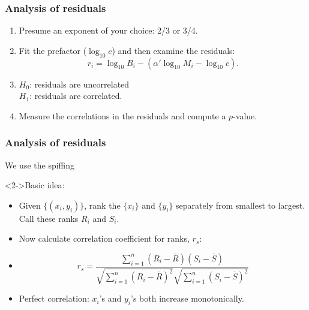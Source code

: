 \begin{frame}
  \frametitle{Analysis of residuals}

  \begin{block}{}
  \begin{enumerate}
  \item<1->
    Presume an exponent of your choice: 2/3 or 3/4.
  \item<2->
    Fit the prefactor ($\log_{10} c$) and then
    examine the residuals:
    $$ 
    r_i = \log_{10} B_i - (\alpha' \log_{10} M_i - \log_{10} c).
    $$
  \item<3->
    $H_0$: residuals are uncorrelated\\
    $H_1$: residuals are correlated.
  \item<4->
    Measure the correlations in the residuals
    and compute a $p$-value.
  \end{enumerate}
  \end{block}

\end{frame}

\begin{frame}
  \frametitle{Analysis of residuals}

  \begin{block}{}
  We use the spiffing 
  \end{block}

  \smallskip

  \begin{block}<2->{Basic idea:}
    \begin{itemize}
    \item<2->
      Given $\{(x_i,y_i)\}$, rank 
      the $\{x_i\}$ and $\{y_i\}$ separately from
      smallest to largest.  Call these ranks $R_i$ and $S_i$.
    \item<3->
      Now calculate correlation coefficient for ranks, $r_s$:
    \item<4->
      {\small
        $$ r_s 
        = 
        \frac{
          \sum_{i=1}^{n} (R_i - \bar{R})(S_i - \bar{S})
        }
        {
          \sqrt{\sum_{i=1}^{n} (R_i - \bar{R})^2}
          \sqrt{\sum_{i=1}^{n} (S_i - \bar{S})^2}
        }
        $$
      }
    \item<5->
      Perfect correlation: $x_i$'s and $y_i$'s both
      increase monotonically.
    \end{itemize}
  \end{block}

\end{frame}


